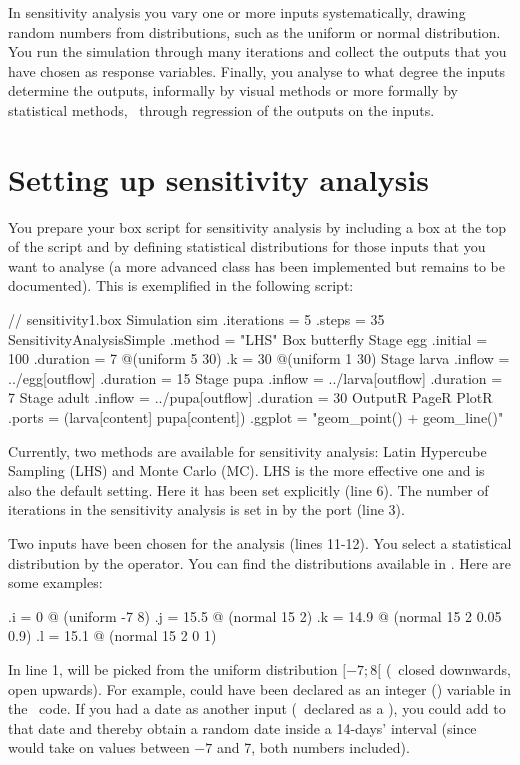 In sensitivity analysis you vary one or more inputs systematically, drawing random numbers from distributions, such as the uniform or normal distribution. You run the simulation through many iterations and collect the outputs that you have chosen as response variables. Finally, you analyse to what degree the inputs determine the outputs, informally by visual methods or more formally by statistical methods, \eg\ through regression of the  outputs on the inputs.

\section{Setting up sensitivity analysis}
You prepare your box script for sensitivity analysis by including a  box at the top of the script and by defining statistical distributions for those inputs that you want to analyse (a more advanced  class has been implemented but remains to be documented). This is exemplified in the following script:

\lstset{numbers=left}
\begin{boxscript}
// sensitivity1.box
Simulation sim {
  .iterations = 5
  .steps = 35
  SensitivityAnalysisSimple {
    .method = "LHS"
  }
  Box butterfly {
    Stage egg {
      .initial = 100 
      .duration = 7 @(uniform 5 30)
      .k = 30 @(uniform 1 30)
    }
    Stage larva {
      .inflow = ../egg[outflow]
      .duration = 15
    }
    Stage pupa {
      .inflow = ../larva[outflow]
      .duration = 7
    }
    Stage adult {
      .inflow = ../pupa[outflow]
      .duration = 30
    }
  }
  OutputR {
    PageR {
      PlotR {
        .ports = (larva[content] pupa[content])
        .ggplot = "geom_point() + geom_line()"
      }
    }
  }
}
\end{boxscript}
\lstset{numbers=none}

Currently, two methods are available for sensitivity analysis: Latin Hypercube Sampling (LHS) and Monte Carlo (MC). LHS is the more effective one and is also the default setting. Here it has been set explicitly (line 6). The number of iterations in the sensitivity analysis is set in  by the  port (line 3).

Two inputs have been chosen for the analysis (lines 11-12). You select a statistical distribution by the  operator. You can find the distributions available in .  Here are some examples:
\lstset{numbers=left}
\begin{boxscript}
.i = 0 @ (uniform -7 8)
.j = 15.5 @ (normal 15 2)
.k = 14.9 @ (normal 15 2 0.05 0.9)
.l = 15.1 @ (normal 15 2 0 1)
\end{boxscript}
\lstset{numbers=none}
In line 1,  will be picked from the uniform distribution $[-7;8[$ (\ie\ closed downwards, open upwards). For example,  could have been declared as an integer () variable in the \CPP\ code. If you had a date as another input (\ie\ declared as a ), you could add  to that date and thereby obtain a random date inside a 14-days' interval (since  would take on values between $-7$ and 7, both numbers included).

